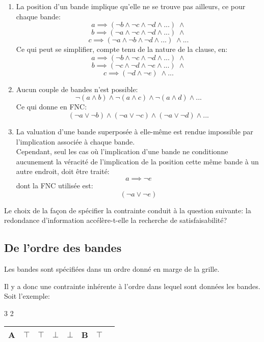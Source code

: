 \documentclass[a4paper,12pt]{report}
\newcommand\black{\cellcolor{black}}
\begin{document}
\begin{enumerate}
\item La position d'un bande implique qu'elle ne se trouve pas ailleurs, ce pour chaque bande:
$$a \implies (\lnot b \wedge \lnot c \wedge \lnot d \wedge ... )\; \wedge$$
$$b \implies (\lnot a \wedge \lnot c \wedge \lnot d \wedge ... )\; \wedge$$
$$c \implies (\lnot a \wedge \lnot b \wedge \lnot d \wedge ... )\; \wedge ...$$
Ce qui peut se simplifier, compte tenu de la nature de la clause, en:
$$a \implies (\lnot b \wedge \lnot c \wedge \lnot d \wedge ... )\; \wedge$$
$$b \implies (\lnot c \wedge \lnot d \wedge \lnot e \wedge ... )\; \wedge$$
$$c \implies (\lnot d \wedge \lnot e)\; \wedge ...$$

\item Aucun couple de bandes n'est possible:
$$\lnot(a \wedge b) \wedge \lnot(a \wedge c) \wedge \lnot(a \wedge d) \wedge ...  $$
Ce qui donne en FNC: 
$$(\lnot a \vee \lnot b) \wedge (\lnot a \vee \lnot c) \wedge (\lnot a \vee \lnot d) \wedge ...$$

\item La valuation d'une bande superposée à elle-même est rendue impossible par l'implication associée à chaque bande.\\
Cependant, seul les cas où l'implication d'une bande ne conditionne aucunement la véracité de l'implication de la position cette même bande à un autre endroit, doit être traité: \\
$$a \implies \lnot e$$
dont la FNC utilisée est:		
$$(\lnot a \vee \lnot e)$$
\end{enumerate}

Le choix de la façon de spécifier la contrainte conduit à la question suivante: la redondance d'information accélère-t-elle la recherche de satisfaisabilité? 

\subsection{De l'ordre des bandes}

Les bandes sont spécifiées dans un ordre donné en marge de la grille. 

Il y a donc une contrainte inhérente à l'ordre dans lequel sont données les bandes.\\

Soit l'exemple: 
\begin{center}
3 2 
\begin{tabular}{|c|c|c|c|c|c|c|c|}
\hline
	\black \color{white} A & \black \color{white}$\top$  & \black \color{white}$\top$  
	& $\bot$ & 	
	$\bot$ & \black \color{white}B  & \black \color{white}$\top$  \\ 			
	\hline
\end{tabular}
\end{center}
\end{document}
